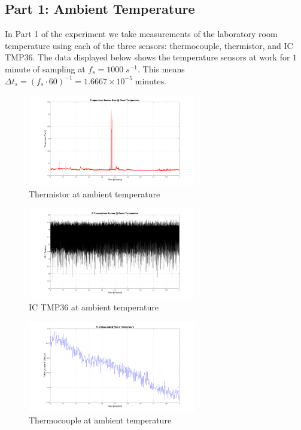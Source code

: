 \documentclass{article}
\begin{document}
    \subsection{Part 1: Ambient Temperature}
    In Part 1 of the experiment we take measurements of the laboratory room temperature using each of the three sensors: thermocouple, thermistor, and IC TMP36. The data displayed below shows the temperature sensors at work for $1$ minute of sampling at $f_{s} = 1000\; s^{-1}$. This means $\Delta t_{s} = (f_{s}\cdot 60)^{-1} = 1.6667\times10^{-5}\; \text{minutes}$.
    
    \begin{figure}[H]
        \centering
        \includegraphics[width=0.655\textwidth]{lab2images/thermistor_volt_roomtemp_1min_plot.png}
        \caption{Thermistor at ambient temperature}
    \end{figure}
    
    \begin{figure}[H]
        \centering
        \includegraphics[width=0.655\textwidth]{lab2images/ICTMP36_roomtemp_1min_plot.png}
        \caption{IC TMP36 at ambient temperature}
    \end{figure}
    
    \begin{figure}[H]
        \centering
        \includegraphics[width=0.655\textwidth]{lab2images/thermocouple_roomtemp_1min_plot.png}
        \caption{Thermocouple at ambient temperature}
    \end{figure}
    
\end{document}
